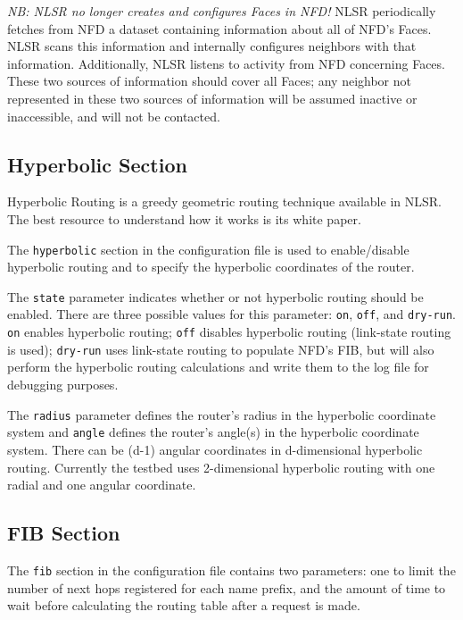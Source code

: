 \emph{NB: NLSR no longer creates and configures Faces in NFD!} NLSR
periodically fetches from NFD a dataset containing information about
all of NFD's Faces. NLSR scans this information and internally
configures neighbors with that information. Additionally, NLSR listens
to activity from NFD concerning Faces. These two sources of
information should cover all Faces; any neighbor not represented in
these two sources of information will be assumed inactive or
inaccessible, and will not be contacted.

\subsection{Hyperbolic Section}

Hyperbolic Routing is a greedy geometric routing technique available in NLSR. The best resource to understand how it works is its white paper. \cite{HyperbolicASF}

The \texttt{hyperbolic} section in the configuration file is used to enable/disable hyperbolic routing and to specify the hyperbolic coordinates of the router.

The \texttt{state} parameter indicates whether or not hyperbolic routing should be enabled. There are three possible values for this parameter: \texttt{on}, \texttt{off}, and \texttt{dry-run}. \texttt{on} enables hyperbolic routing; \texttt{off} disables hyperbolic routing (link-state routing is used); \texttt{dry-run} uses link-state routing to populate NFD's FIB, but will also perform the hyperbolic routing calculations and write them to the log file for debugging purposes.

The \texttt{radius} parameter defines the router's radius in the hyperbolic coordinate system and \texttt{angle} defines the router's angle(s) in the hyperbolic coordinate system. There can be (d-1) angular coordinates in d-dimensional hyperbolic routing. Currently the testbed uses 2-dimensional hyperbolic routing with one radial and one angular coordinate.

\subsection{FIB Section}

The \texttt{fib} section in the configuration file contains two parameters: one to limit the number of next hops registered for each name prefix, and the amount of time to wait before calculating the routing table after a request is made.

